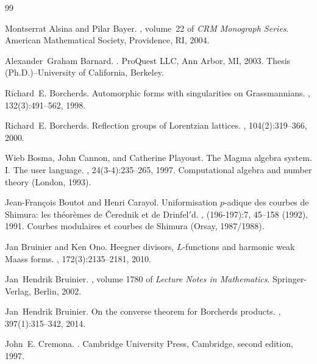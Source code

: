 \documentclass{amsart}
\theoremstyle{definition}
\begin{document}
\def\cprime{$'$}
\begin{thebibliography}{99}

Montserrat Alsina and Pilar Bayer.
,
  volume~22 of {\em CRM Monograph Series}.
\newblock American Mathematical Society, Providence, RI, 2004.

Alexander~Graham Barnard.
.
\newblock ProQuest LLC, Ann Arbor, MI, 2003.
\newblock Thesis (Ph.D.)--University of California, Berkeley.

Richard~E. Borcherds.
\newblock Automorphic forms with singularities on {G}rassmannians.
, 132(3):491--562, 1998.

Richard~E. Borcherds.
\newblock Reflection groups of {L}orentzian lattices.
, 104(2):319--366, 2000.

Wieb Bosma, John Cannon, and Catherine Playoust.
\newblock The {M}agma algebra system. {I}. {T}he user language.
, 24(3-4):235--265, 1997.
\newblock Computational algebra and number theory (London, 1993).

Jean-Fran\c{c}ois Boutot and Henri Carayol.
\newblock Uniformisation {$p$}-adique des courbes de {S}himura: les
  th\'eor\`emes de \v {C}erednik et de {D}rinfel\cprime d.
, (196-197):7, 45--158 (1992), 1991.
\newblock Courbes modulaires et courbes de Shimura (Orsay, 1987/1988).

Jan Bruinier and Ken Ono.
\newblock Heegner divisors, {$L$}-functions and harmonic weak {M}aass forms.
, 172(3):2135--2181, 2010.

Jan~Hendrik Bruinier.
, volume 1780 of {\em Lecture Notes in Mathematics}.
\newblock Springer-Verlag, Berlin, 2002.

Jan~Hendrik Bruinier.
\newblock On the converse theorem for {B}orcherds products.
, 397(1):315--342, 2014.

John~E. Cremona.
.
\newblock Cambridge University Press, Cambridge, second edition, 1997.


\end{thebibliography}
\end{document}
